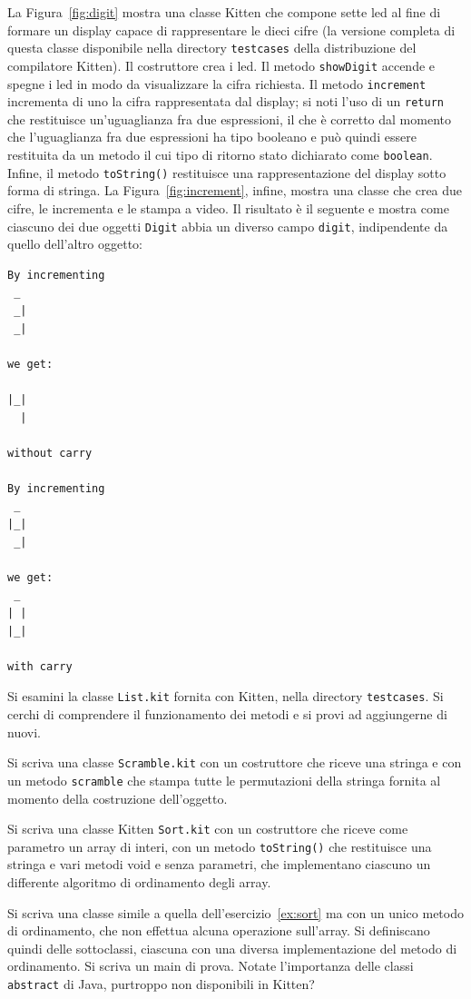 La Figura~\ref{fig:digit} mostra una classe Kitten che compone sette
led al fine di formare un display capace di rappresentare le dieci cifre
(la versione completa di questa classe \e disponibile nella directory
\texttt{testcases} della distribuzione del compilatore Kitten).
Il costruttore crea i led. Il metodo \texttt{showDigit} accende e spegne
i led in modo da visualizzare la cifra richiesta. Il metodo
\texttt{increment} incrementa di uno la cifra rappresentata dal display;
si noti l'uso di un \texttt{return} che restituisce un'uguaglianza fra
due espressioni, il che \`e corretto dal momento che l'uguaglianza fra due
espressioni ha tipo booleano e pu\`o quindi essere restituita da un metodo
il cui tipo di ritorno \e stato dichiarato come \texttt{boolean}.
Infine, il metodo \texttt{toString()} restituisce una rappresentazione del
display sotto forma di stringa.
La Figura~\ref{fig:increment}, infine, mostra una classe che crea
due cifre, le incrementa e le stampa a video. Il risultato \`e il seguente
e mostra come ciascuno dei due oggetti \texttt{Digit} abbia un diverso
campo \texttt{digit}, indipendente da quello dell'altro oggetto:
%
\begin{verbatim}
By incrementing
 _
 _|
 _|

we get:

|_|
  |

without carry

By incrementing
 _
|_|
 _|

we get:
 _
| |
|_|

with carry
\end{verbatim}
%
\clearpage
%
\begin{exercise}\label{ex:list}
Si esamini la classe \texttt{List.kit} fornita con Kitten, nella
directory \texttt{testcases}. Si cerchi di comprendere il funzionamento
dei metodi e si provi ad aggiungerne di nuovi.
\end{exercise}
%
\begin{exercise}\label{ex:scramble}
Si scriva una classe \texttt{Scramble.kit} con un costruttore che riceve
una stringa e con un metodo \texttt{scramble} che stampa tutte le permutazioni
della stringa fornita al momento della costruzione dell'oggetto.
\end{exercise}
%
\begin{exercise}\label{ex:sort}
Si scriva una classe Kitten \texttt{Sort.kit} con un costruttore che
riceve come parametro un array di interi, con un metodo \texttt{toString()} che
restituisce una stringa e vari metodi void e senza parametri,
che implementano ciascuno un differente algoritmo di ordinamento degli array.
\end{exercise}
%
\begin{exercise}\label{ex:sort2}
Si scriva una classe simile a quella dell'esercizio~\ref{ex:sort} ma
con un unico metodo di ordinamento, che non effettua alcuna operazione
sull'array. Si definiscano quindi delle sottoclassi, ciascuna
con una diversa implementazione del metodo di ordinamento. Si scriva un
main di prova. Notate l'importanza delle classi \texttt{abstract} di Java,
purtroppo non disponibili in Kitten?
\end{exercise}
